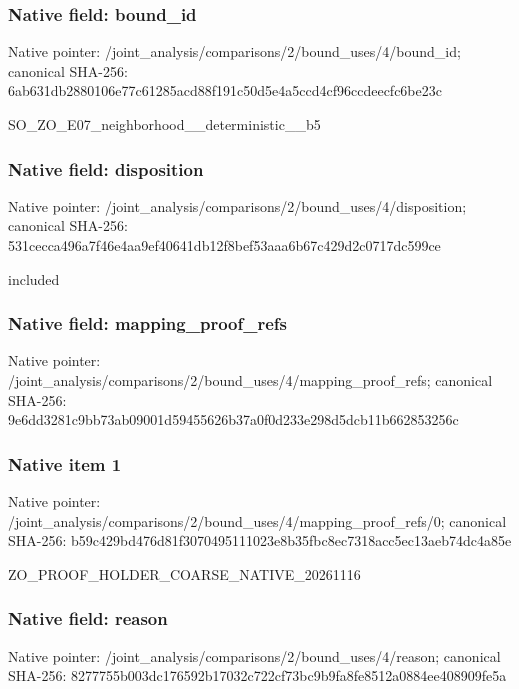 \documentclass[10pt,a4paper]{article}
\begin{document}
\subsubsection{Native field: bound\_\allowbreak{}id}
Native pointer: /joint\_\allowbreak{}analysis/comparisons/2/bound\_\allowbreak{}uses/4/bound\_\allowbreak{}id; canonical SHA-256: 6ab631db2880106e77c61285acd88f191c50d5e4a5ccd4cf96ccdeecfc6be23c

\begingroup\raggedright\sloppy SO\_\allowbreak{}ZO\_\allowbreak{}E07\_\allowbreak{}neighborhood\_\allowbreak{}\_\allowbreak{}deterministic\_\allowbreak{}\_\allowbreak{}b5\par\endgroup

\subsubsection{Native field: disposition}
Native pointer: /joint\_\allowbreak{}analysis/comparisons/2/bound\_\allowbreak{}uses/4/disposition; canonical SHA-256: 531cecca496a7f46e4aa9ef40641db12f8bef53aaa6b67c429d2c0717dc599ce

\begingroup\raggedright\sloppy included\par\endgroup

\subsubsection{Native field: mapping\_\allowbreak{}proof\_\allowbreak{}refs}
Native pointer: /joint\_\allowbreak{}analysis/comparisons/2/bound\_\allowbreak{}uses/4/mapping\_\allowbreak{}proof\_\allowbreak{}refs; canonical SHA-256: 9e6dd3281c9bb73ab09001d59455626b37a0f0d233e298d5dcb11b662853256c

\subsubsection{Native item 1}
Native pointer: /joint\_\allowbreak{}analysis/comparisons/2/bound\_\allowbreak{}uses/4/mapping\_\allowbreak{}proof\_\allowbreak{}refs/0; canonical SHA-256: b59c429bd476d81f3070495111023e8b35fbc8ec7318acc5ec13aeb74dc4a85e

\begingroup\raggedright\sloppy ZO\_\allowbreak{}PROOF\_\allowbreak{}HOLDER\_\allowbreak{}COARSE\_\allowbreak{}NATIVE\_\allowbreak{}20261116\par\endgroup

\subsubsection{Native field: reason}
Native pointer: /joint\_\allowbreak{}analysis/comparisons/2/bound\_\allowbreak{}uses/4/reason; canonical SHA-256: 8277755b003dc176592b17032c722cf73bc9b9fa8fe8512a0884ee408909fe5a
\end{document}
